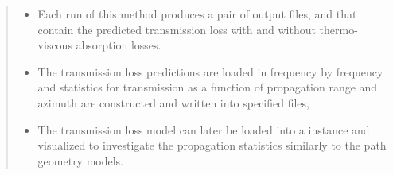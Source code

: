 \documentclass[letterpaper,10pt,english]{sphinxmanual}
\begin{document}
\begin{itemize}
\begin{quote}
\begin{sphinxVerbatim}[commandchars=\\\{\}]
   
         
\end{sphinxVerbatim}
\begin{itemize}
\item {} 
Each run of this method produces a pair of output files,  and  that contain the predicted transmission loss with and without thermo-viscous absorption losses.

\item {} 
The transmission loss predictions are loaded in frequency by frequency and statistics for transmission as a function of propagation range and azimuth are constructed and written into specified files,

\end{itemize}

\begin{sphinxVerbatim}[commandchars=\\\{\}]
   
      
               
\end{sphinxVerbatim}
\begin{itemize}
\item {} 
The transmission loss model can later be loaded into a  instance and visualized to investigate the propagation statistics similarly to the path geometry models.


\end{itemize}
\end{quote}
\end{itemize}
\end{document}
